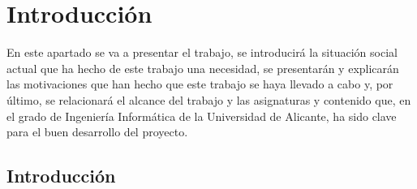 
\chapter{Introducción}
En este apartado se va a presentar el trabajo, se introducirá la situación social actual que ha hecho de este trabajo una necesidad, se presentarán y explicarán las motivaciones que han hecho que este trabajo se haya llevado a cabo y, por último, se relacionará el alcance del trabajo y las asignaturas y contenido que, en el grado de Ingeniería Informática de la Universidad de Alicante, ha sido clave para el buen desarrollo del proyecto.

 
\section{Introducción}


